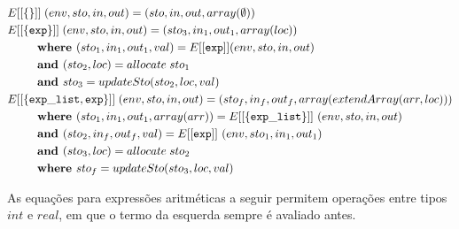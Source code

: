 \documentclass[12pt]{article}
\begin{document}
\begin{align*}
&E[[{\tt \{\}}]] \;(env,sto,in,out) = (sto,in,out,array(\emptyset)) \\
&E[[{\tt \{exp\}}]] \;(env,sto,in,out) = (sto_3, in_1, out_1, array(loc)) \\
&\hspace{6ex}\textbf{where } (sto_1, in_1, out_1, val) = E[[{\tt exp}]] (env,sto,in,out) \\
&\hspace{6ex} \textbf{and } (sto_2,loc) = allocate\; sto_1\\
&\hspace{6ex}\textbf{and } sto_3 = updateSto(sto_2,loc,val) \\
&E[[{\tt \{exp\_list, exp\}}]] \;(env,sto,in,out) = (sto_f, in_f, out_f, array(extendArray(arr, loc))) \\
&\hspace{6ex}\textbf{where } (sto_1, in_1, out_1, array(arr)) = E[[{\tt\{ exp\_list\}}]]\ (env, sto, in, out) \\
&\hspace{6ex}\textbf{and } (sto_2, in_f, out_f, val) = E[[{\tt exp}]]\ (env, sto_1, in_1, out_1) \\
&\hspace{6ex}\textbf{and } (sto_3,loc) = allocate\; sto_2\\
&\hspace{6ex}\textbf{where } sto_f = updateSto(sto_3,loc,val) \\
\end{align*}

As equações para expressões aritméticas a seguir permitem operações entre tipos $int$ e $real$, em que o termo da esquerda sempre é avaliado antes.
\end{document}
